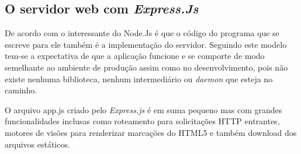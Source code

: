 \subsection{O servidor web com \textit{Express.Js}}
\label{servidor-web-express-js}

  
  De acordo com \cite{Wilson:2013} o interessante do Node.Js é que o código do 
  programa que se escreve para ele também é a implementação do servidor. 
  Seguindo este modelo tem-se a expectativa de que a aplicação funcione e se comporte de modo semelhante 
  ao ambiente de produção assim como no desenvolvimento, pois não existe nenhuma biblioteca, nenhum intermediário 
  ou \textit{daemon} que esteja no caminho.
  
  O arquivo app.js criado pelo \textit{Express.js} é em suma pequeno mas com grandes funcionalidades inclusas como 
  roteamento para solicitações \ac{HTTP} entrantes, motores de visões para renderizar marcações do HTML5
  e também download dos arquivos estáticos.